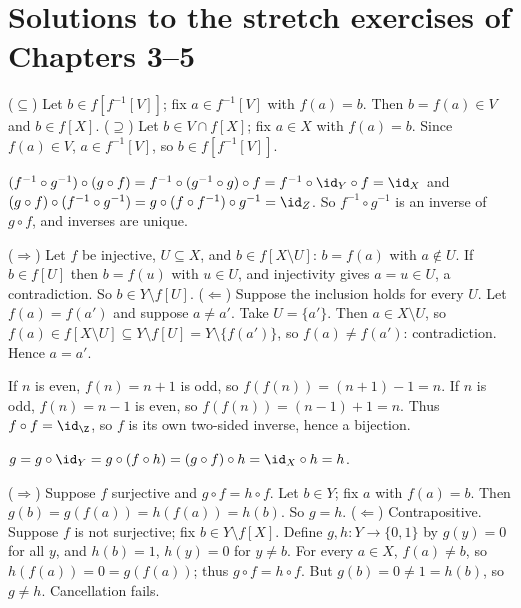 \renewcommand{\chapterprefix}{Appendix}\renewcommand{\thechapter}{T}
\chapter{Solutions to the stretch exercises of Chapters 3--5}

 ($\subseteq$) Let $b\in f[f^{-1}[V]]$; fix $a\in f^{-1}[V]$ with $f(a)=b$. Then $b=f(a)\in V$ and $b\in f[X]$. ($\supseteq$) Let $b\in V\cap f[X]$; fix $a\in X$ with $f(a)=b$. Since $f(a)\in V$, $a\in f^{-1}[V]$, so $b\in f[f^{-1}[V]]$.

 $(f^{-1}\circ g^{-1})\circ(g\circ f)=f^{-1}\circ(g^{-1}\circ g)\circ f=f^{-1}\circ\id_Y\circ f=\id_X$ and $(g\circ f)\circ(f^{-1}\circ g^{-1})=g\circ(f\circ f^{-1})\circ g^{-1}=\id_Z$. So $f^{-1}\circ g^{-1}$ is an inverse of $g\circ f$, and inverses are unique.

 ($\Rightarrow$) Let $f$ be injective, $U\subseteq X$, and $b\in f[X\setminus U]$: $b=f(a)$ with $a\notin U$. If $b\in f[U]$ then $b=f(u)$ with $u\in U$, and injectivity gives $a=u\in U$, a contradiction. So $b\in Y\setminus f[U]$. ($\Leftarrow$) Suppose the inclusion holds for every $U$. Let $f(a)=f(a')$ and suppose $a\ne a'$. Take $U=\{a'\}$. Then $a\in X\setminus U$, so $f(a)\in f[X\setminus U]\subseteq Y\setminus f[U]=Y\setminus\{f(a')\}$, so $f(a)\ne f(a')$: contradiction. Hence $a=a'$.

 If $n$ is even, $f(n)=n+1$ is odd, so $f(f(n))=(n+1)-1=n$. If $n$ is odd, $f(n)=n-1$ is even, so $f(f(n))=(n-1)+1=n$. Thus $f\circ f=\id_\Z$, so $f$ is its own two-sided inverse, hence a bijection.

 $g=g\circ\id_Y=g\circ(f\circ h)=(g\circ f)\circ h=\id_X\circ h=h$.

 ($\Rightarrow$) Suppose $f$ surjective and $g\circ f=h\circ f$. Let $b\in Y$; fix $a$ with $f(a)=b$. Then $g(b)=g(f(a))=h(f(a))=h(b)$. So $g=h$. ($\Leftarrow$) Contrapositive. Suppose $f$ is not surjective; fix $b\in Y\setminus f[X]$. Define $g,h:Y\to\{0,1\}$ by $g(y)=0$ for all $y$, and $h(b)=1$, $h(y)=0$ for $y\ne b$. For every $a\in X$, $f(a)\ne b$, so $h(f(a))=0=g(f(a))$; thus $g\circ f=h\circ f$. But $g(b)=0\ne1=h(b)$, so $g\ne h$. Cancellation fails.

